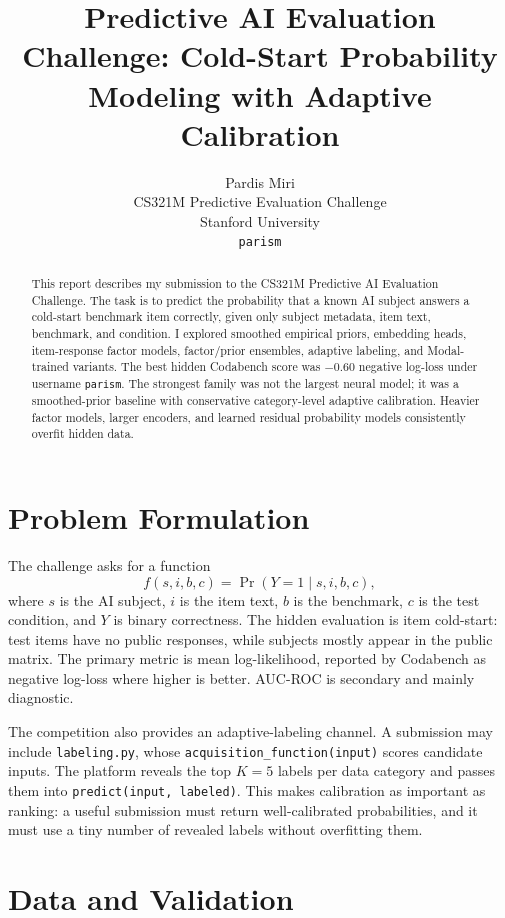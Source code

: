 \documentclass{article}
\title{Predictive AI Evaluation Challenge: Cold-Start Probability Modeling with Adaptive Calibration}
\author{%
  Pardis Miri \\
  CS321M Predictive Evaluation Challenge \\
  Stanford University \\
  \texttt{parism}
}
\begin{document}
\maketitle

\begin{abstract}
This report describes my submission to the CS321M Predictive AI Evaluation Challenge. The task is to predict the probability that a known AI subject answers a cold-start benchmark item correctly, given only subject metadata, item text, benchmark, and condition. I explored smoothed empirical priors, embedding heads, item-response factor models, factor/prior ensembles, adaptive labeling, and Modal-trained variants. The best hidden Codabench score was $-0.60$ negative log-loss under username \texttt{parism}. The strongest family was not the largest neural model; it was a smoothed-prior baseline with conservative category-level adaptive calibration. Heavier factor models, larger encoders, and learned residual probability models consistently overfit hidden data.
\end{abstract}

\section{Problem Formulation}

The challenge asks for a function
\[
  f(s,i,b,c) = \Pr(Y=1 \mid s,i,b,c),
\]
where $s$ is the AI subject, $i$ is the item text, $b$ is the benchmark, $c$ is the test condition, and $Y$ is binary correctness. The hidden evaluation is item cold-start: test items have no public responses, while subjects mostly appear in the public matrix. The primary metric is mean log-likelihood, reported by Codabench as negative log-loss where higher is better. AUC-ROC is secondary and mainly diagnostic.

The competition also provides an adaptive-labeling channel. A submission may include \texttt{labeling.py}, whose \texttt{acquisition\_function(input)} scores candidate inputs. The platform reveals the top $K=5$ labels per data category and passes them into \texttt{predict(input, labeled)}. This makes calibration as important as ranking: a useful submission must return well-calibrated probabilities, and it must use a tiny number of revealed labels without overfitting them.

\section{Data and Validation}
\end{document}
